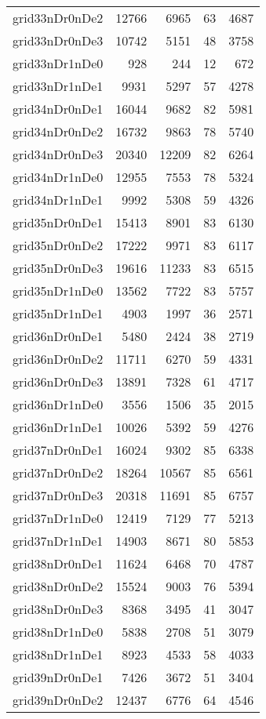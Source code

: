 \begin{longtable}{lrrrr}
grid33nDr0nDe2 & 12766 & 6965 & 63 & 4687 \\
grid33nDr0nDe3 & 10742 & 5151 & 48 & 3758 \\
grid33nDr1nDe0 & 928 & 244 & 12 & 672 \\
grid33nDr1nDe1 & 9931 & 5297 & 57 & 4278 \\
grid34nDr0nDe1 & 16044 & 9682 & 82 & 5981 \\
grid34nDr0nDe2 & 16732 & 9863 & 78 & 5740 \\
grid34nDr0nDe3 & 20340 & 12209 & 82 & 6264 \\
grid34nDr1nDe0 & 12955 & 7553 & 78 & 5324 \\
grid34nDr1nDe1 & 9992 & 5308 & 59 & 4326 \\
grid35nDr0nDe1 & 15413 & 8901 & 83 & 6130 \\
grid35nDr0nDe2 & 17222 & 9971 & 83 & 6117 \\
grid35nDr0nDe3 & 19616 & 11233 & 83 & 6515 \\
grid35nDr1nDe0 & 13562 & 7722 & 83 & 5757 \\
grid35nDr1nDe1 & 4903 & 1997 & 36 & 2571 \\
grid36nDr0nDe1 & 5480 & 2424 & 38 & 2719 \\
grid36nDr0nDe2 & 11711 & 6270 & 59 & 4331 \\
grid36nDr0nDe3 & 13891 & 7328 & 61 & 4717 \\
grid36nDr1nDe0 & 3556 & 1506 & 35 & 2015 \\
grid36nDr1nDe1 & 10026 & 5392 & 59 & 4276 \\
grid37nDr0nDe1 & 16024 & 9302 & 85 & 6338 \\
grid37nDr0nDe2 & 18264 & 10567 & 85 & 6561 \\
grid37nDr0nDe3 & 20318 & 11691 & 85 & 6757 \\
grid37nDr1nDe0 & 12419 & 7129 & 77 & 5213 \\
grid37nDr1nDe1 & 14903 & 8671 & 80 & 5853 \\
grid38nDr0nDe1 & 11624 & 6468 & 70 & 4787 \\
grid38nDr0nDe2 & 15524 & 9003 & 76 & 5394 \\
grid38nDr0nDe3 & 8368 & 3495 & 41 & 3047 \\
grid38nDr1nDe0 & 5838 & 2708 & 51 & 3079 \\
grid38nDr1nDe1 & 8923 & 4533 & 58 & 4033 \\
grid39nDr0nDe1 & 7426 & 3672 & 51 & 3404 \\
grid39nDr0nDe2 & 12437 & 6776 & 64 & 4546 \\

\end{longtable}
